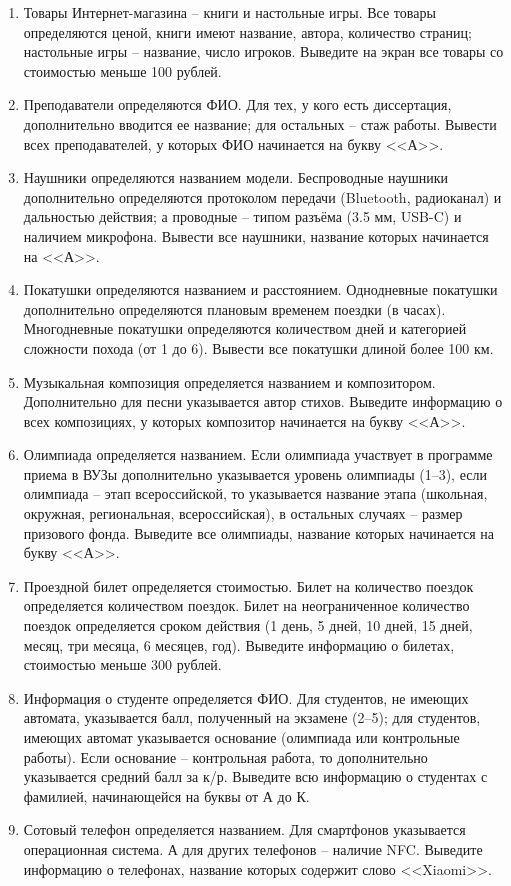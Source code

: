 \begin{enumerate}
\item Товары Интернет-магазина -- книги и настольные игры. Все товары определяются ценой, книги имеют название,
автора, количество страниц; настольные игры -- название, число игроков.
Выведите на экран все товары со стоимостью меньше 100 рублей.
\item Преподаватели определяются ФИО. Для тех, у кого есть диссертация, дополнительно вводится ее название;
для остальных -- стаж работы. Вывести всех преподавателей, у которых ФИО начинается на букву <<А>>.
\item Наушники определяются названием модели. Беспроводные наушники дополнительно определяются
протоколом передачи (Bluetooth, радиоканал) и дальностью действия; а проводные -- типом разъёма
(3.5 мм, USB-C) и наличием микрофона.
Вывести все наушники, название которых начинается на <<А>>.
\item Покатушки определяются названием и расстоянием. Однодневные покатушки дополнительно определяются
плановым временем поездки (в часах). Многодневные покатушки определяются количеством дней и категорией сложности
похода (от 1 до 6). Вывести все покатушки длиной более 100 км.
\item Музыкальная композиция определяется названием и композитором. Дополнительно для песни указывается
автор стихов. Выведите информацию о всех композициях, у которых композитор начинается на букву <<А>>.
\item Олимпиада определяется названием. Если олимпиада участвует в программе приема в ВУЗы дополнительно
указывается уровень олимпиады (1--3), если олимпиада -- этап всероссийской, то указывается название этапа
(школьная, окружная, региональная, всероссийская), в остальных случаях -- размер призового фонда.
Выведите все олимпиады, название которых начинается на букву <<А>>.
\item Проездной билет определяется стоимостью. Билет на количество поездок определяется 
количеством поездок. Билет на неограниченное количество поездок
определяется сроком действия (1 день, 5 дней, 10 дней, 15 дней, месяц, три месяца, 6 месяцев, год).
Выведите информацию о билетах, стоимостью меньше 300 рублей.
\item Информация о студенте определяется ФИО. Для студентов, не имеющих автомата, указывается балл,
полученный на экзамене (2--5); для студентов, имеющих автомат указывается основание (олимпиада или контрольные работы).
Если основание -- контрольная работа, то дополнительно указывается средний балл за к/р.
Выведите всю информацию о студентах с фамилией, начинающейся на буквы от А до К.
\item Сотовый телефон определяется названием. Для смартфонов указывается операционная система. А для других телефонов
-- наличие NFC. Выведите информацию о телефонах, название которых содержит слово <<Xiaomi>>.


\end{enumerate}

